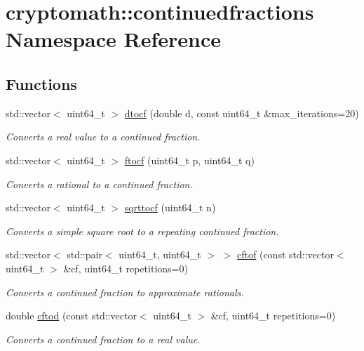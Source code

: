 \hypertarget{namespacecryptomath_1_1continuedfractions}{}\section{cryptomath\+:\+:continuedfractions Namespace Reference}
\label{namespacecryptomath_1_1continuedfractions}
\subsection*{Functions}
\begin{DoxyCompactItemize}
\item 
std\+::vector$<$ uint64\+\_\+t $>$ \hyperlink{namespacecryptomath_1_1continuedfractions_af87b96352efe22d9def88f39cbdaf5ac}{dtocf} (double d, const uint64\+\_\+t \&max\+\_\+iterations=20)
\begin{DoxyCompactList}\small\item\em Converts a real value to a continued fraction. \end{DoxyCompactList}\item 
std\+::vector$<$ uint64\+\_\+t $>$ \hyperlink{namespacecryptomath_1_1continuedfractions_ac3b6555ab2b9daaa1e8f87c7a6e3df20}{ftocf} (uint64\+\_\+t p, uint64\+\_\+t q)
\begin{DoxyCompactList}\small\item\em Converts a rational to a continued fraction. \end{DoxyCompactList}\item 
std\+::vector$<$ uint64\+\_\+t $>$ \hyperlink{namespacecryptomath_1_1continuedfractions_ae623004528a5e561255f468807116656}{sqrttocf} (uint64\+\_\+t n)
\begin{DoxyCompactList}\small\item\em Converts a simple square root to a repeating continued fraction. \end{DoxyCompactList}\item 
std\+::vector$<$ std\+::pair$<$ uint64\+\_\+t, uint64\+\_\+t $>$ $>$ \hyperlink{namespacecryptomath_1_1continuedfractions_a3241a0ecf56e1613ef0fed6153811301}{cftof} (const std\+::vector$<$ uint64\+\_\+t $>$ \&cf, uint64\+\_\+t repetitions=0)
\begin{DoxyCompactList}\small\item\em Converts a continued fraction to approximate rationals. \end{DoxyCompactList}\item 
double \hyperlink{namespacecryptomath_1_1continuedfractions_a48be92979e70c335f3531294f728edc2}{cftod} (const std\+::vector$<$ uint64\+\_\+t $>$ \&cf, uint64\+\_\+t repetitions=0)
\begin{DoxyCompactList}\small\item\em Converts a continued fraction to a real value. \end{DoxyCompactList}\end{DoxyCompactItemize}


